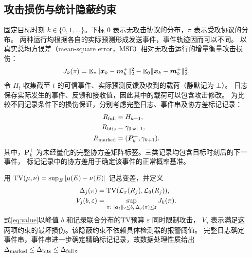 \subsection{攻击损伤与统计隐蔽约束}
固定目标时刻 $k\in\{0,1,\ldots\}$。下标 $0$ 表示无攻击协议的分布，$\pi$ 表示受攻协议的分布。
两种运行均根据各自的实际预测形成发送事件，事件轨迹因而可以不同。
以真实总均方误差（mean-square error，MSE）相对无攻击运行的增量衡量攻击损伤：
\begin{equation}
 J_k(\pi)=\mathbb E_\pi\|{\bm{x}}_k-{\bm{m}}_k^+\|_2^2-
             \mathbb E_0\|{\bm{x}}_k-{\bm{m}}_k^+\|_2^2.
 \label{eq:damage}
\end{equation}
令 $H_t$ 收集截至 $t$ 的可信事件、实际预测反馈及收到的载荷（静默记为 $\bot$）。
日志保存实际发生的事件、反馈和接收值，因此其中的载荷可以包含攻击修改。
为比较不同记录条件下的损伤保证，分别考虑完整日志、事件串及协方差标记记录：
\begin{equation}
 \begin{aligned}
 R_{\rm full}&=H_{k+1},\\
 R_{\rm bits}&=\gamma_{0:k+1},\\
 R_{\rm marked}&=({\bm{P}}_k^+,\gamma_{k+1}).
 \end{aligned}
 \label{eq:records}
\end{equation}
其中，${\bm{P}}_k^+$ 为未经量化的完整协方差矩阵标签。三类记录均包含目标时刻后的下一事件，
标记记录中的协方差用于确定该事件的正常概率基准。

用 $\operatorname{TV}(\mu,\nu)=\sup_E|\mu(E)-\nu(E)|$ 记总变差，并定义
\begin{equation}
 \begin{aligned}
 \Delta_j(\pi)&=\operatorname{TV}(\mathcal L_\pi(R_j),\mathcal L_0(R_j)),\\
 V_j(b,\varepsilon)&=\sup_{\pi:\,\|{\bm{a}}_t\|_2\le b,\,\Delta_j(\pi)\le\varepsilon}J_k(\pi).
 \end{aligned}
 \label{eq:value}
\end{equation}
式\eqref{eq:value}以峰值 $b$ 和记录联合分布的TV预算 $\varepsilon$ 同时限制攻击，
$V_j$ 表示满足这两项约束的最坏损伤。该隐蔽约束不依赖具体检测器的报警阈值。
完整日志确定事件串，事件串进一步确定精确标记记录，故数据处理性质给出
$\Delta_{\rm marked}\le\Delta_{\rm bits}\le\Delta_{\rm full}$。

